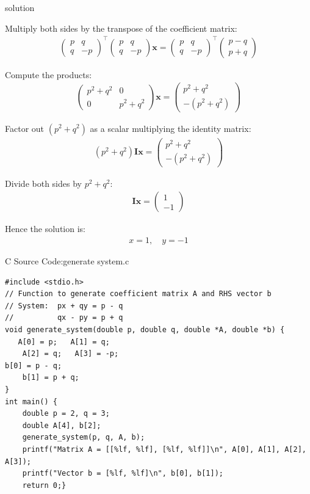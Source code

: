 \documentclass{beamer}
\numberwithin{equation}{section}
\theoremstyle{remark}
\newcommand{\myvec}[1]{\ensuremath{\begin{pmatrix}#1\end{pmatrix}}}
\let\vec\mathbf
\begin{document}
\begin{frame}{solution}

Multiply both sides by the transpose of the coefficient matrix:
\begin{align}
\myvec{p & q \\ q & -p}^\top \myvec{p & q \\ q & -p} \vec{x} = \myvec{p & q \\ q & -p}^\top \myvec{p-q \\ p+q}
\end{align}

Compute the products:
\begin{align}
\myvec{p^2+q^2 & 0 \\ 0 & p^2+q^2} \vec{x} = \myvec{p^2 + q^2 \\ -(p^2+q^2)}
\end{align}

Factor out $(p^2+q^2)$ as a scalar multiplying the identity matrix:
\begin{align}
(p^2+q^2) \vec{I} \vec{x} = \myvec{p^2+q^2 \\ -(p^2+q^2)}
\end{align}

Divide both sides by $p^2+q^2$:
\begin{align}
\vec{I} \vec{x} = \myvec{1 \\ -1}
\end{align}



Hence the solution is:
\begin{align}
x = 1, \quad y = -1
\end{align}
\end{frame}
\begin{frame}[fragile]{C Source Code:generate system.c}
\begin{verbatim}
#include <stdio.h>
// Function to generate coefficient matrix A and RHS vector b
// System:  px + qy = p - q
//          qx - py = p + q
void generate_system(double p, double q, double *A, double *b) {
   A[0] = p;   A[1] = q;
    A[2] = q;   A[3] = -p;
b[0] = p - q;
    b[1] = p + q;
}
int main() {
    double p = 2, q = 3;
    double A[4], b[2];
    generate_system(p, q, A, b);
    printf("Matrix A = [[%lf, %lf], [%lf, %lf]]\n", A[0], A[1], A[2], A[3]);
    printf("Vector b = [%lf, %lf]\n", b[0], b[1]);
    return 0;}

\end{verbatim}
\end{frame}
\end{document}

